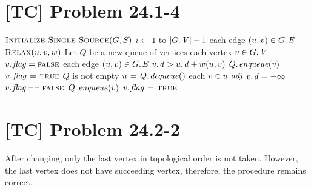 \documentclass[a4paper,11pt,twocolumn]{article}
\newcommand{\FALSE}{\const{false}}
\newcommand{\TRUE}{\const{true}}
\begin{document}
  \section{[TC] Problem 24.1-4}
  \begin{codebox}
  \li $\textnormal{\scshape Initialize-Single-Source}(G,S)$
  \li \For $i \gets 1$ to $|\attrib{G}{V}|-1$ 
  \li \Do  \For each edge $(u, v) \in \attrib{G}{E}$
  \li      \Do  $\textnormal{\scshape Relax}(u, v, w)$
           \End
      \End
  \li Let $Q$ be a new queue of vertices
  \li \For each vertex $v \in \attrib{G}{V}$
  \li \Do  $\attrib{v}{flag} = \FALSE$
      \End
  \li \For each edge $(u, v) \in \attrib{G}{E}$ 
  \li \Do  \If $\attrib{v}{d} > \attrib{u}{d} + w(u, v)$
  \li      \Do $\attrib{Q}{enqueue}(v)$
  \li          $\attrib{v}{flag} \gets \TRUE$
           \End
      \End
  \li \While $Q$ is not empty
  \li \Do    $u \gets \attrib{Q}{dequeue}()$
  \li        \For each $v \in \attrib{u}{adj}$
  \li        \Do  $\attrib{v}{d} = -\infty$
  \li             \If $\attrib{v}{flag} \isequal \FALSE$
  \li             \Do $\attrib{Q}{enqueue}(v)$
  \li                 $\attrib{v}{flag} \gets \TRUE$
                  \End
             \End
      \End
  \end{codebox}  
  
  \section{[TC] Problem 24.2-2}
  After changing, only the last vertex in topological order is not taken. However, the last vertex does not have succeeding vertex, therefore, the procedure remains correct.
  
\end{document}
